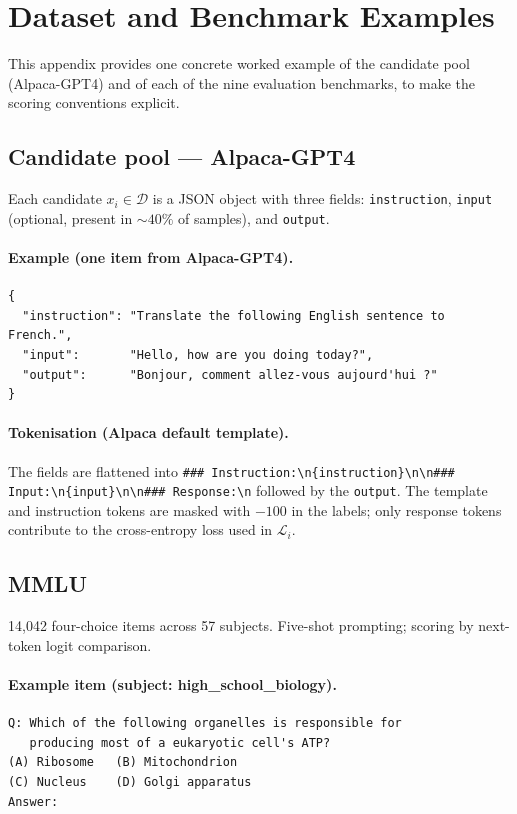 \section{Dataset and Benchmark Examples}
\label{app:examples}

This appendix provides one concrete worked example of the candidate
pool (Alpaca-GPT4) and of each of the nine evaluation benchmarks,
to make the scoring conventions explicit.

\subsection{Candidate pool — Alpaca-GPT4}
\label{app:ex-alpaca}

Each candidate $x_i \in \mathcal{D}$ is a JSON object with three
fields: \texttt{instruction}, \texttt{input} (optional, present in
${\sim}40\%$ of samples), and \texttt{output}.

\paragraph{Example (one item from Alpaca-GPT4).}
\begin{verbatim}
{
  "instruction": "Translate the following English sentence to French.",
  "input":       "Hello, how are you doing today?",
  "output":      "Bonjour, comment allez-vous aujourd'hui ?"
}
\end{verbatim}

\paragraph{Tokenisation (Alpaca default template).}
The fields are flattened into
\verb|### Instruction:\n{instruction}\n\n### Input:\n{input}\n\n### Response:\n|
followed by the \texttt{output}. The template and instruction
tokens are masked with $-100$ in the labels; only response tokens
contribute to the cross-entropy loss used in $\mathcal{L}_i$.

\subsection{MMLU}
\label{app:ex-mmlu}

14{,}042 four-choice items across 57 subjects. Five-shot prompting;
scoring by next-token logit comparison.

\paragraph{Example item (subject: high\_school\_biology).}
\begin{verbatim}
Q: Which of the following organelles is responsible for
   producing most of a eukaryotic cell's ATP?
(A) Ribosome   (B) Mitochondrion
(C) Nucleus    (D) Golgi apparatus
Answer:
\end{verbatim}

